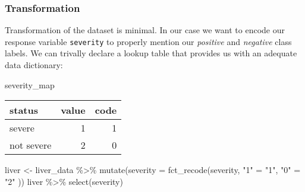 \documentclass[
  11pt,
  a4paper,
]{scrartcl}
\newenvironment{Shaded}{\begin{snugshade}}{\end{snugshade}}
\newcommand{\AttributeTok}[1]{\textcolor[rgb]{0.77,0.63,0.00}{#1}}
\newcommand{\CommentTok}[1]{\textcolor[rgb]{0.56,0.35,0.01}{\textit{#1}}}
\newcommand{\FunctionTok}[1]{\textcolor[rgb]{0.00,0.00,0.00}{#1}}
\newcommand{\NormalTok}[1]{#1}
\newcommand{\OtherTok}[1]{\textcolor[rgb]{0.56,0.35,0.01}{#1}}
\newcommand{\SpecialCharTok}[1]{\textcolor[rgb]{0.00,0.00,0.00}{#1}}
\newcommand{\StringTok}[1]{\textcolor[rgb]{0.31,0.60,0.02}{#1}}
\begin{document}
\begin{Shaded}
\end{Shaded}

\hypertarget{transformation}{%
\subsubsection{Transformation}\label{transformation}}

Transformation of the dataset is minimal. In our case we want to encode
our response variable \texttt{severity} to properly mention our
\emph{positive} and \emph{negative} class labels. We can trivally
declare a lookup table that provides us with an adequate data
dictionary:

\begin{Shaded}
\begin{Highlighting}[]
\NormalTok{severity\_map}
\end{Highlighting}
\end{Shaded}

\begin{longtable}[]{@{}lrr@{}}
\toprule
status & value & code \\
\midrule
\endhead
severe & 1 & 1 \\
not severe & 2 & 0 \\
\bottomrule
\end{longtable}

\begin{Shaded}
\begin{Highlighting}[]
\NormalTok{liver }\OtherTok{\textless{}{-}}\NormalTok{ liver\_data }\SpecialCharTok{\%\textgreater{}\%}
  \FunctionTok{mutate}\NormalTok{(}\AttributeTok{severity =} \FunctionTok{fct\_recode}\NormalTok{(severity,}
    \StringTok{"1"} \OtherTok{=} \StringTok{"1"}\NormalTok{,}
    \StringTok{"0"} \OtherTok{=} \StringTok{"2"}
\NormalTok{  ))}
\NormalTok{liver }\SpecialCharTok{\%\textgreater{}\%}  \FunctionTok{select}\NormalTok{(severity)}
\end{Highlighting}
\end{Shaded}
\end{document}
